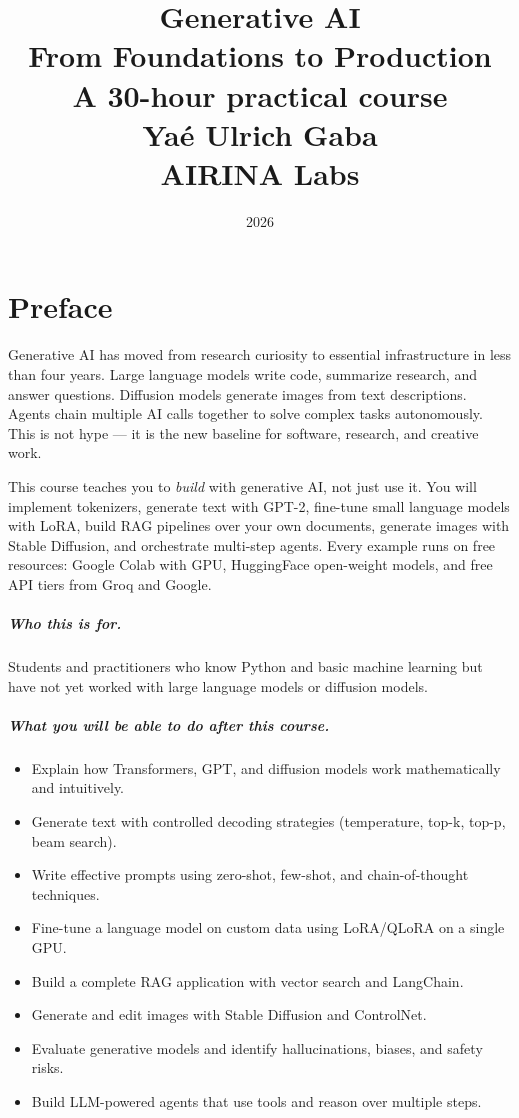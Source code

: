 \documentclass[12pt,a4paper,twoside]{book}
\title{
  \vspace{-2cm}
  {\Huge\bfseries Generative AI}\\[6pt]
  {\LARGE From Foundations to Production}\\[12pt]
  {\large A 30-hour practical course}\\[24pt]
  {\normalsize Yaé Ulrich Gaba}\\[4pt]
  {\small AIRINA Labs}
}
\date{2026}
\author{}
\begin{document}
\frontmatter
\maketitle

\tableofcontents
\newpage

\chapter*{Preface}

Generative AI has moved from research curiosity to essential infrastructure in less than four years. Large language models write code, summarize research, and answer questions. Diffusion models generate images from text descriptions. Agents chain multiple AI calls together to solve complex tasks autonomously. This is not hype --- it is the new baseline for software, research, and creative work.

This course teaches you to \emph{build} with generative AI, not just use it. You will implement tokenizers, generate text with GPT-2, fine-tune small language models with LoRA, build RAG pipelines over your own documents, generate images with Stable Diffusion, and orchestrate multi-step agents. Every example runs on free resources: Google Colab with GPU, HuggingFace open-weight models, and free API tiers from Groq and Google.

\paragraph{Who this is for.} Students and practitioners who know Python and basic machine learning but have not yet worked with large language models or diffusion models.

\paragraph{What you will be able to do after this course.}
\begin{itemize}
  \item Explain how Transformers, GPT, and diffusion models work mathematically and intuitively.
  \item Generate text with controlled decoding strategies (temperature, top-k, top-p, beam search).
  \item Write effective prompts using zero-shot, few-shot, and chain-of-thought techniques.
  \item Fine-tune a language model on custom data using LoRA/QLoRA on a single GPU.
  \item Build a complete RAG application with vector search and LangChain.
  \item Generate and edit images with Stable Diffusion and ControlNet.
  \item Evaluate generative models and identify hallucinations, biases, and safety risks.
  \item Build LLM-powered agents that use tools and reason over multiple steps.
\end{itemize}
\end{document}

